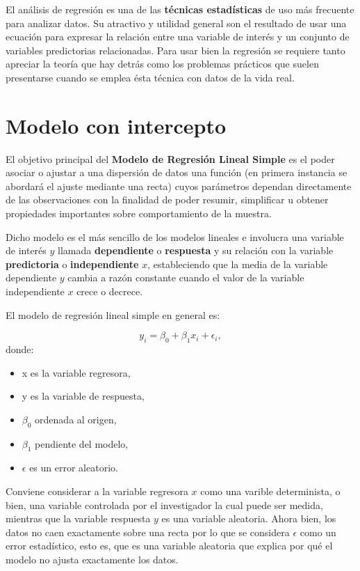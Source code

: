 \documentclass[
  a4paper,
  oneside,
  openany]{book}
\begin{document}
El análisis de regresión es una de las \textbf{técnicas estadísticas} de uso más frecuente para analizar datos. Su atractivo y utilidad general son el resultado de usar una ecuación para expresar la relación entre una variable de interés y un conjunto de variables predictorias relacionadas. Para usar bien la regresión se requiere tanto apreciar la teoría que hay detrás como los problemas prácticos que suelen presentarse cuando se emplea ésta técnica con datos de la vida real.

\hypertarget{modelo-con-intercepto}{%
\chapter{Modelo con intercepto}\label{modelo-con-intercepto}}

El objetivo principal del \textbf{Modelo de Regresión Lineal Simple} es el poder asociar o ajustar a una dispersión de datos una función (en primera instancia se abordará el ajuste mediante una recta) cuyos parámetros dependan directamente de las observaciones con la finalidad de poder resumir, simplificar u obtener propiedades importantes sobre comportamiento de la muestra.

Dicho modelo es el más sencillo de los modelos lineales e involucra una variable de interés \(y\) llamada \textbf{dependiente} o \textbf{respuesta} y su relación con la variable \textbf{predictoria} o \textbf{independiente} \(x\), estableciendo que la media de la variable dependiente \(y\) cambia a razón constante cuando el valor de la variable independiente \(x\) crece o decrece.

El modelo de regresión lineal simple en general es:

\[y_{i}=\beta_{0}+\beta_{1}x_{i}+\epsilon_{i},\]
donde:

\begin{itemize}
\item
  x es la variable regresora,
\item
  y es la variable de respuesta,
\item
  \(\beta_{0}\) ordenada al origen,
\item
  \(\beta_{1}\) pendiente del modelo,
\item
  \(\epsilon\) es un error aleatorio.
\end{itemize}

Conviene considerar a la variable regresora \(x\) como una varible determinista, o bien, una variable controlada por el investigador la cual puede ser medida, mientras que la variable respuesta \(y\) es una variable aleatoria. Ahora bien, los datos no caen exactamente sobre una recta por lo que se considera \(\epsilon\) como un error estadístico, esto es, que es una variable aleatoria que explica por qué el modelo no ajusta exactamente los datos.
\end{document}
